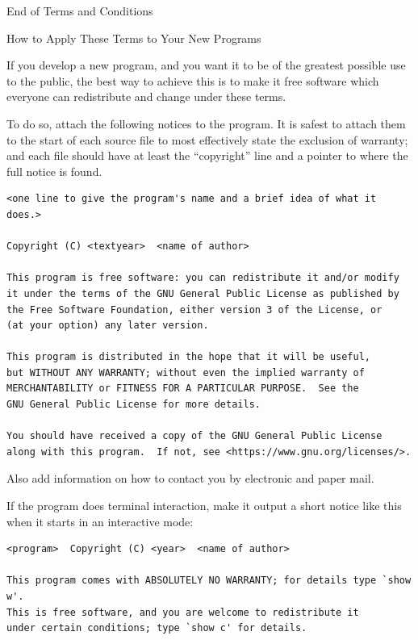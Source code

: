 \documentclass[11pt,twoside,fleqn,openright,titlepage]{cslreport}
\begin{document}
\begin{small}
\begin{enumerate}
\begin{center}
{\Large\sc End of Terms and Conditions}

\bigskip
How to Apply These Terms to Your New Programs
\end{center}

If you develop a new program, and you want it to be of the greatest
possible use to the public, the best way to achieve this is to make it
free software which everyone can redistribute and change under these terms.

To do so, attach the following notices to the program.  It is safest
to attach them to the start of each source file to most effectively
state the exclusion of warranty; and each file should have at least
the ``copyright'' line and a pointer to where the full notice is found.

{\footnotesize
\begin{verbatim}
<one line to give the program's name and a brief idea of what it does.>

Copyright (C) <textyear>  <name of author>

This program is free software: you can redistribute it and/or modify
it under the terms of the GNU General Public License as published by
the Free Software Foundation, either version 3 of the License, or
(at your option) any later version.

This program is distributed in the hope that it will be useful,
but WITHOUT ANY WARRANTY; without even the implied warranty of
MERCHANTABILITY or FITNESS FOR A PARTICULAR PURPOSE.  See the
GNU General Public License for more details.

You should have received a copy of the GNU General Public License
along with this program.  If not, see <https://www.gnu.org/licenses/>.
\end{verbatim}
}

Also add information on how to contact you by electronic and paper mail.

If the program does terminal interaction, make it output a short
notice like this when it starts in an interactive mode:

{\footnotesize
\begin{verbatim}
<program>  Copyright (C) <year>  <name of author>

This program comes with ABSOLUTELY NO WARRANTY; for details type `show w'.
This is free software, and you are welcome to redistribute it
under certain conditions; type `show c' for details.
\end{verbatim}
}


\end{enumerate}
\end{small}
\end{document}
